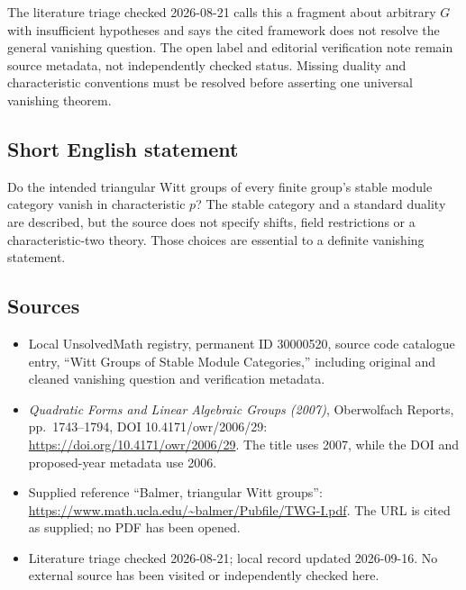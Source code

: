 \documentclass[11pt]{article}
\begin{document}
The literature triage checked 2026-08-21 calls this a fragment about arbitrary \(G\) with insufficient hypotheses and says the cited framework does not resolve the general vanishing question. The open label and editorial verification note remain source metadata, not independently checked status. Missing duality and characteristic conventions must be resolved before asserting one universal vanishing theorem.
\subsection{Short English statement}
Do the intended triangular Witt groups of every finite group's stable module category vanish in characteristic \(p\)? The stable category and a standard duality are described, but the source does not specify shifts, field restrictions or a characteristic-two theory. Those choices are essential to a definite vanishing statement.
\subsection{Sources}
\begin{itemize}
\item Local UnsolvedMath registry, permanent ID 30000520, source code catalogue entry, ``Witt Groups of Stable Module Categories,'' including original and cleaned vanishing question and verification metadata.
\item \emph{Quadratic Forms and Linear Algebraic Groups (2007)}, Oberwolfach Reports, pp.\ 1743--1794, DOI 10.4171/owr/2006/29: \url{https://doi.org/10.4171/owr/2006/29}. The title uses 2007, while the DOI and proposed-year metadata use 2006.
\item Supplied reference ``Balmer, triangular Witt groups'': \url{https://www.math.ucla.edu/~balmer/Pubfile/TWG-I.pdf}. The URL is cited as supplied; no PDF has been opened.
\item Literature triage checked 2026-08-21; local record updated 2026-09-16. No external source has been visited or independently checked here.
\end{itemize}
\end{document}
